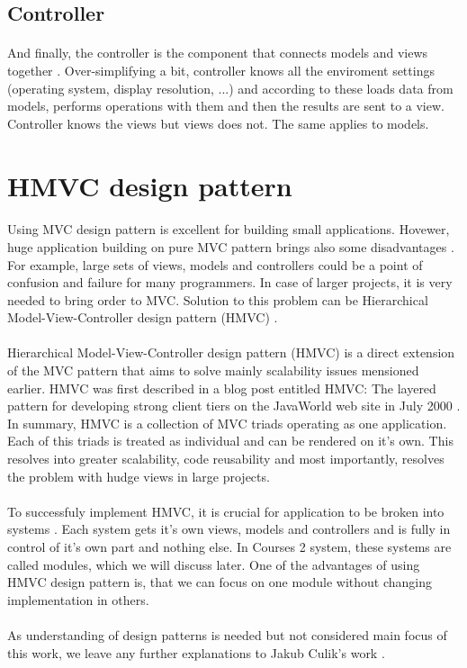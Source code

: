 \subsection{Controller}
\paragraph{}
And finally, the controller is the component that connects models and views together \cite{phpmvc}. Over-simplifying a bit, controller knows all the enviroment settings (operating system, display resolution, ...) and according to these loads data from models, performs operations with them and then the results are sent to a view. Controller knows the views but views does not. The same applies to models.

\section{HMVC design pattern}
\paragraph{}
Using MVC design pattern is excellent for building small applications. Hovewer, huge application building on pure MVC pattern brings also some disadvantages \cite{culik}. For example, large sets of views, models and controllers could be a point of confusion and failure for many programmers. In case of larger projects, it is very needed to bring order to MVC. Solution to this problem can be Hierarchical Model-View-Controller design pattern (HMVC) \cite{hmvc}.

\paragraph{}
Hierarchical Model-View-Controller design pattern (HMVC) is a direct extension of the MVC pattern that aims to solve mainly scalability issues mensioned earlier. HMVC was first described in a blog post entitled HMVC: The layered pattern for developing strong client tiers on the JavaWorld web site in July 2000 \cite{hmvc}. In summary, HMVC is a collection of MVC triads operating as one application. Each of this triads is treated as individual and can be rendered on it's own. This resolves into greater scalability, code reusability and most importantly, resolves the problem with hudge views in large projects.

\paragraph{}
To successfuly implement HMVC, it is crucial for application to be broken into systems \cite{hmvc}. Each system gets it's own views, models and controllers and is fully in control of it's own part and nothing else. In Courses 2 system, these systems are called modules, which we will discuss later. One of the advantages of using HMVC design pattern is, that we can focus on one module without changing implementation in others.

\paragraph{}
As understanding of design patterns is needed but not considered main focus of this work, we leave any further explanations to Jakub Culik's work \cite{culik}.
